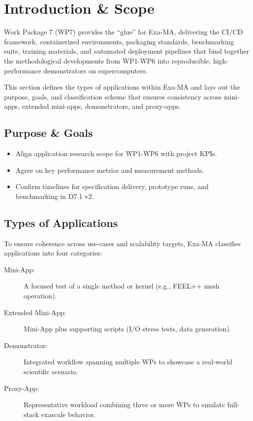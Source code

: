 
\section{Introduction \& Scope}
\label{sec:apps-intro}

Work Package 7 (WP7) provides the “glue” for Exa-MA, delivering the CI/CD framework, containerized environments, packaging standards, benchmarking suite, training materials, and automated deployment pipelines that bind together the methodological developments from WP1-WP6 into reproducible, high-performance demonstrators on supercomputers.

This section defines the types of applications within Exa-MA and lays out the purpose, goals, and classification scheme that ensures consistency across mini-apps, extended mini-apps, demonstrators, and proxy-apps.

\subsection{Purpose \& Goals}
\begin{itemize}
  \item Align application research scope for WP1-WP6 with project KPIs.
  \item Agree on key performance metrics and measurement methods.
  \item Confirm timelines for specification delivery, prototype runs, and benchmarking in D7.1 v2.
\end{itemize}

\subsection{Types of Applications}
To ensure coherence across use-cases and scalability targets, Exa-MA classifies applications into four categories:
\begin{description}
  \item[Mini-App:] A focused test of a single method or kernel (e.g., FEEL++ mesh operation).  
  \item[Extended Mini-App:] Mini-App plus supporting scripts (I/O stress tests, data generation).  
  \item[Demonstrator:] Integrated workflow spanning multiple WPs to showcase a real-world scientific scenario.  
  \item[Proxy-App:] Representative workload combining three or more WPs to emulate full-stack exascale behavior.  
\end{description}